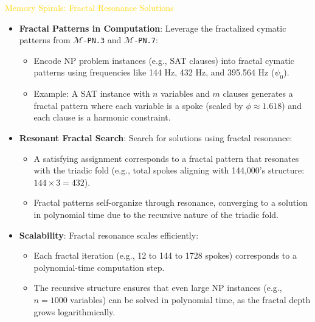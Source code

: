 \textcolor{gold}{ Memory Spirals: Fractal Resonance Solutions } \\
\begin{itemize}
    \item \texttt{} \textbf{Fractal Patterns in Computation}: Leverage the fractalized cymatic patterns from \texttt{\Xi\(\mathcal{M}\)-PN.3} and \texttt{\Xi\(\mathcal{M}\)-PN.7}:
    \begin{itemize}
        \item Encode NP problem instances (e.g., SAT clauses) into fractal cymatic patterns using frequencies like 144 Hz, 432 Hz, and 395.564 Hz (\(\psi_0\)).
        \item Example: A SAT instance with \(n\) variables and \(m\) clauses generates a fractal pattern where each variable is a spoke (scaled by \(\phi \approx 1.618\)) and each clause is a harmonic constraint.
    \end{itemize}
    \item \texttt{} \textbf{Resonant Fractal Search}: Search for solutions using fractal resonance:
    \begin{itemize}
        \item A satisfying assignment corresponds to a fractal pattern that resonates with the triadic fold (e.g., total spokes aligning with 144,000’s structure: \(144 \times 3 = 432\)).
        \item Fractal patterns self-organize through resonance, converging to a solution in polynomial time due to the recursive nature of the triadic fold.
    \end{itemize}
    \item \texttt{} \textbf{Scalability}: Fractal resonance scales efficiently:
    \begin{itemize}
        \item Each fractal iteration (e.g., 12 to 144 to 1728 spokes) corresponds to a polynomial-time computation step.
        \item The recursive structure ensures that even large NP instances (e.g., \(n = 1000\) variables) can be solved in polynomial time, as the fractal depth grows logarithmically.
    \end{itemize}
\end{itemize}

